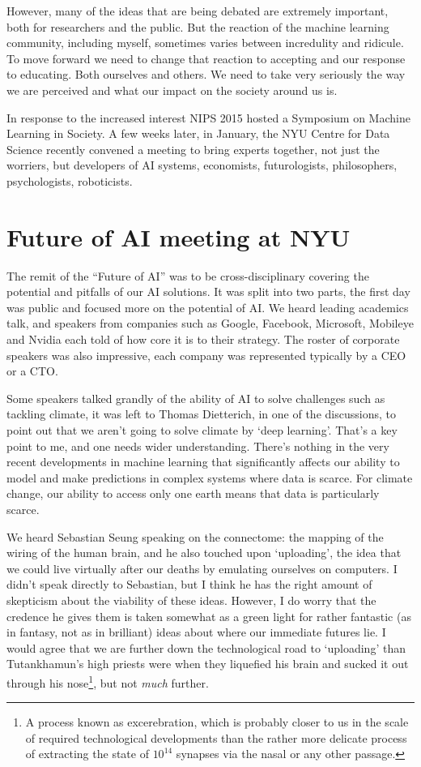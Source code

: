 \documentclass[a4paper]{caesar_book}
\begin{document}
However, many of the ideas that are being debated are extremely important, both for researchers and the public. But the reaction of the machine learning community, including myself, sometimes varies between incredulity and ridicule. To move forward we need to change that reaction to accepting and our response to educating. Both ourselves and others. We need to take very seriously the way we are perceived and what our impact on the society around us is.

In response to the increased interest NIPS 2015 hosted a Symposium on Machine Learning in Society. A few weeks later, in January, the NYU Centre for Data Science recently convened a meeting to bring experts together, not just the worriers, but developers of AI systems, economists, futurologists, philosophers, psychologists, roboticists. 

\section{Future of AI meeting at NYU}

The remit of the “Future of AI” was to be cross-disciplinary covering the potential and pitfalls of our AI solutions. It was split into two parts, the first day was public and focused more on the potential of AI. We heard leading academics talk, and speakers from companies such as Google, Facebook, Microsoft, Mobileye and Nvidia each told of how core it is to their strategy. The roster of corporate speakers was also impressive, each company was represented typically by a CEO or a CTO.

Some speakers talked grandly of the ability of AI to solve challenges such as tackling climate, it was left to Thomas Dietterich, in one of the discussions, to point out that we aren’t going to solve climate by ‘deep learning’. That’s a key point to me, and one needs wider understanding. There’s nothing in the very recent developments in machine learning that significantly affects our ability to model and make predictions in complex systems where data is scarce. For climate change, our ability to access only one earth means that data is particularly scarce.

We heard Sebastian Seung speaking on the connectome: the mapping of the wiring of the human brain, and he also touched upon ‘uploading’, the idea that we could live virtually after our deaths by emulating ourselves on computers. I didn’t speak directly to Sebastian, but I think he has the right amount of skepticism about the viability of these ideas. However, I do worry that the credence he gives them is taken somewhat as a green light for rather fantastic (as in fantasy, not as in brilliant) ideas about where our immediate futures lie. I would agree that we are further down the technological road to ‘uploading’ than Tutankhamun’s high priests were when they liquefied his brain and sucked it out through his nose\footnote{A process known as excerebration, which is probably closer to us in the scale of required technological developments than the rather more delicate process of extracting the state of $10^14$ synapses via the nasal or any other passage.}, but not \textit{much} further.
\end{document}

